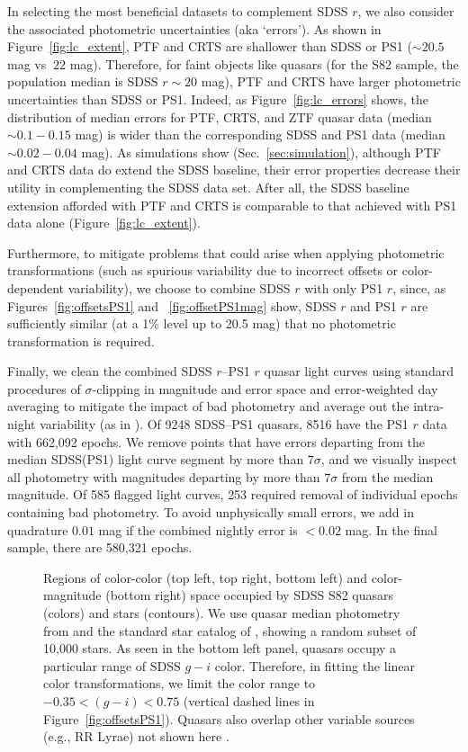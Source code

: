 \documentclass[twocolumn]{aastex62}
\begin{document}
In selecting the most beneficial datasets to complement SDSS $r$, we also consider the associated photometric uncertainties (aka `errors'). As shown in Figure~\ref{fig:lc_extent},  PTF and CRTS are shallower than SDSS or PS1 ($\sim20.5$ mag vs $~22$ mag). Therefore, for faint objects like quasars (for the S82 sample, the population median is SDSS $r{\sim}20$ mag), PTF and CRTS have larger photometric uncertainties than SDSS or PS1. Indeed, as Figure~\ref{fig:lc_errors} shows, the distribution of median errors for PTF, CRTS, and ZTF quasar data (median $\sim0.1-0.15$ mag) is wider than the corresponding SDSS and PS1 data (median ${\sim}0.02-0.04$ mag). As simulations show (Sec.~\ref{sec:simulation}), although PTF and CRTS data do extend the SDSS baseline, their error properties decrease their utility in complementing the SDSS data set. After all, the SDSS baseline extension afforded with PTF and CRTS is comparable to that achieved with PS1 data alone (Figure~\ref{fig:lc_extent}). 

Furthermore, to mitigate problems that could arise when applying photometric transformations (such as spurious variability due to incorrect offsets or color-dependent variability), we choose to combine SDSS $r$ with only PS1 $r$, since, as Figures~\ref{fig:offsetsPS1} and ~\ref{fig:offsetPS1mag} show, SDSS $r$ and PS1 $r$ are sufficiently similar (at a 1\% level up to 20.5 mag) that no photometric transformation is required. 

Finally, we clean the combined SDSS $r$--PS1 $r$ quasar light curves using standard procedures of  $\sigma$-clipping in magnitude and error space and error-weighted day averaging to mitigate the impact of bad photometry and average out the intra-night variability (as in \citealt{charisi2016,suberlak2017}). Of 9248 SDSS--PS1 quasars, 8516 have the PS1 $r$ data with 662,092 epochs.  We remove points that have errors departing from the median SDSS(PS1) light curve segment by more than $7 \sigma$, and we visually inspect all photometry with magnitudes departing by more than  $7\sigma$ from the median magnitude. Of 585 flagged light curves, 253 required removal of individual epochs containing bad photometry. To avoid unphysically small errors,  we add in quadrature $0.01$ mag if the combined nightly error is $<0.02$ mag. In the final sample, there are 580,321 epochs. 


\begin{figure*} 
	\caption{Regions of color-color (top left, top right, bottom left) and color-magnitude (bottom right)  space occupied by SDSS S82 quasars (colors) and stars (contours). We use quasar median photometry from \citet{schneider2010} and the standard star catalog of \citet{ivezic2007}, showing a random subset of 10,000 stars. As seen in the bottom left panel, quasars occupy a particular range of SDSS $g-i$ color. Therefore, in fitting the linear color transformations, we limit the color range to $-0.35<(g-i)<0.75$ (vertical dashed lines in Figure~\ref{fig:offsetsPS1}). Quasars also overlap other variable sources (e.g., RR Lyrae) not shown here \citep{sesar2007}. }
	\label{fig:quasarColors}
\end{figure*} 
\end{document}
